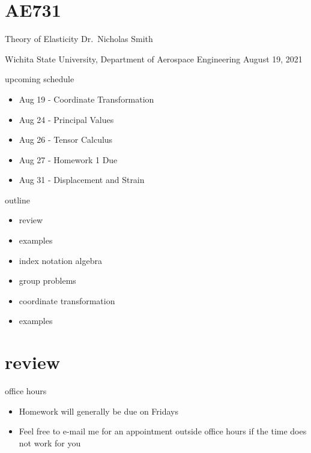\documentclass[
  letterpaper,
  ignorenonframetext,
  aspectratio=43,
  handout,
  12pt]{beamer}
\author{}
\date{}
\providecommand{\tightlist}{%
  \setlength{\itemsep}{0pt}\setlength{\parskip}{0pt}}
\providecommand{\tightlist}{%
\setlength{\itemsep}{0pt}\setlength{\parskip}{0pt}}
\begin{document}
\hypertarget{ae731}{%
\section{AE731}\label{ae731}}

\begin{frame}{Theory of Elasticity}
\protect\hypertarget{theory-of-elasticity}{}
Dr.~Nicholas Smith

Wichita State University, Department of Aerospace Engineering August 19,
2021
\end{frame}

\begin{frame}{upcoming schedule}
\protect\hypertarget{upcoming-schedule}{}
\begin{itemize}
\tightlist
\item
  Aug 19 - Coordinate Transformation
\item
  Aug 24 - Principal Values
\item
  Aug 26 - Tensor Calculus
\item
  Aug 27 - Homework 1 Due
\item
  Aug 31 - Displacement and Strain
\end{itemize}
\end{frame}

\begin{frame}{outline}
\protect\hypertarget{outline}{}
\begin{itemize}
\tightlist
\item
  review
\item
  examples
\item
  index notation algebra
\item
  group problems
\item
  coordinate transformation
\item
  examples
\end{itemize}
\end{frame}

\hypertarget{review}{%
\section{review}\label{review}}

\begin{frame}{office hours}
\protect\hypertarget{office-hours}{}
\begin{itemize}
\tightlist
\item
  Homework will generally be due on Fridays
\item
  Feel free to e-mail me for an appointment outside office hours if the
  time does not work for you
\end{itemize}
\end{frame}
\end{document}
